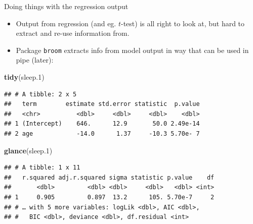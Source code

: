 \documentclass[ignorenonframetext,]{beamer}
\newenvironment{Shaded}{\begin{snugshade}}{\end{snugshade}}
\newcommand{\FloatTok}[1]{\textcolor[rgb]{0.00,0.00,0.81}{#1}}
\newcommand{\KeywordTok}[1]{\textcolor[rgb]{0.13,0.29,0.53}{\textbf{#1}}}
\newcommand{\NormalTok}[1]{#1}
\begin{document}
\begin{frame}[fragile]{Doing things with the regression output}
\protect\hypertarget{doing-things-with-the-regression-output}{}

\begin{itemize}
\item
  Output from regression (and eg. \(t\)-test) is all right to look at,
  but hard to extract and re-use information from.
\item
  Package \texttt{broom} extracts info from model output in way that can
  be used in pipe (later):
\end{itemize}

\begin{Shaded}
\begin{Highlighting}[]
\KeywordTok{tidy}\NormalTok{(sleep}\FloatTok{.1}\NormalTok{)}
\end{Highlighting}
\end{Shaded}

\begin{verbatim}
## # A tibble: 2 x 5
##   term        estimate std.error statistic  p.value
##   <chr>          <dbl>     <dbl>     <dbl>    <dbl>
## 1 (Intercept)    646.      12.9       50.0 2.49e-14
## 2 age            -14.0      1.37     -10.3 5.70e- 7
\end{verbatim}

\begin{Shaded}
\begin{Highlighting}[]
\KeywordTok{glance}\NormalTok{(sleep}\FloatTok{.1}\NormalTok{)}
\end{Highlighting}
\end{Shaded}

\begin{verbatim}
## # A tibble: 1 x 11
##   r.squared adj.r.squared sigma statistic p.value    df
##       <dbl>         <dbl> <dbl>     <dbl>   <dbl> <int>
## 1     0.905         0.897  13.2      105. 5.70e-7     2
## # … with 5 more variables: logLik <dbl>, AIC <dbl>,
## #   BIC <dbl>, deviance <dbl>, df.residual <int>
\end{verbatim}

\end{frame}
\end{document}
